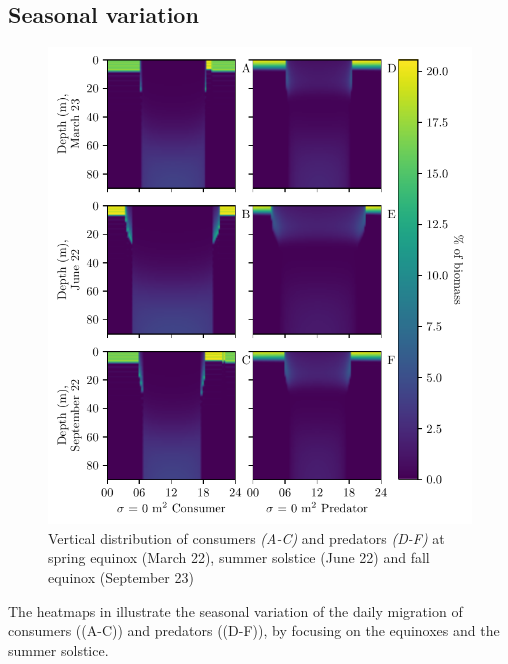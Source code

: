 
\subsection*{Seasonal variation}
\begin{figure}[H]
\includegraphics{plots/total_heatmap.pdf}
\caption{Vertical distribution of consumers \emph{(A-C)} and predators \emph{(D-F)} at spring equinox (March 22), summer solstice (June 22) and fall equinox (September 23)}
\label{fig:heatmap_total}
\end{figure}
The heatmaps in  illustrate the seasonal variation of the daily migration of consumers ((A-C)) and predators ((D-F)), by focusing on the equinoxes and the summer solstice.
